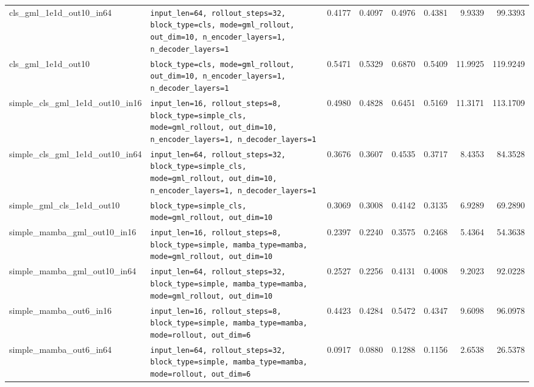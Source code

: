 \begin{table}[ht]
\begin{tabular}{ll rr rr rr}
cls\_gml\_1e1d\_out10\_in64 & \texttt{input\_len=64, rollout\_steps=32, block\_type=cls, mode=gml\_rollout, out\_dim=10, n\_encoder\_layers=1, n\_decoder\_layers=1} & 0.4177 & 0.4097 & 0.4976 & 0.4381 & 9.9339 & 99.3393 \\
cls\_gml\_1e1d\_out10 & \texttt{block\_type=cls, mode=gml\_rollout, out\_dim=10, n\_encoder\_layers=1, n\_decoder\_layers=1} & 0.5471 & 0.5329 & 0.6870 & 0.5409 & 11.9925 & 119.9249 \\
simple\_cls\_gml\_1e1d\_out10\_in16 & \texttt{input\_len=16, rollout\_steps=8, block\_type=simple\_cls, mode=gml\_rollout, out\_dim=10, n\_encoder\_layers=1, n\_decoder\_layers=1} & 0.4980 & 0.4828 & 0.6451 & 0.5169 & 11.3171 & 113.1709 \\
simple\_cls\_gml\_1e1d\_out10\_in64 & \texttt{input\_len=64, rollout\_steps=32, block\_type=simple\_cls, mode=gml\_rollout, out\_dim=10, n\_encoder\_layers=1, n\_decoder\_layers=1} & 0.3676 & 0.3607 & 0.4535 & 0.3717 & 8.4353 & 84.3528 \\
simple\_gml\_cls\_1e1d\_out10 & \texttt{block\_type=simple\_cls, mode=gml\_rollout, out\_dim=10} & 0.3069 & 0.3008 & 0.4142 & 0.3135 & 6.9289 & 69.2890 \\
simple\_mamba\_gml\_out10\_in16 & \texttt{input\_len=16, rollout\_steps=8, block\_type=simple, mamba\_type=mamba, mode=gml\_rollout, out\_dim=10} & 0.2397 & 0.2240 & 0.3575 & 0.2468 & 5.4364 & 54.3638 \\
simple\_mamba\_gml\_out10\_in64 & \texttt{input\_len=64, rollout\_steps=32, block\_type=simple, mamba\_type=mamba, mode=gml\_rollout, out\_dim=10} & 0.2527 & 0.2256 & 0.4131 & 0.4008 & 9.2023 & 92.0228 \\
simple\_mamba\_out6\_in16 & \texttt{input\_len=16, rollout\_steps=8, block\_type=simple, mamba\_type=mamba, mode=rollout, out\_dim=6} & 0.4423 & 0.4284 & 0.5472 & 0.4347 & 9.6098 & 96.0978 \\
simple\_mamba\_out6\_in64 & \texttt{input\_len=64, rollout\_steps=32, block\_type=simple, mamba\_type=mamba, mode=rollout, out\_dim=6} & 0.0917 & 0.0880 & 0.1288 & 0.1156 & 2.6538 & 26.5378 \\
\bottomrule
\end{tabular}
\end{table}
